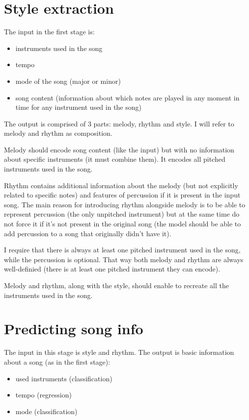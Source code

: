 \documentclass[en]{pracamgr}
\begin{document}
\section{Style extraction}

The input in the first stage is:
\begin{itemize}
    \item instruments used in the song
    \item tempo
    \item mode of the song (major or minor)
    \item song content (information about which notes are played in any moment in time for any instrument used in the song)
\end{itemize}

The output is comprised of 3 parts: melody, rhythm and style.
I will refer to melody and rhythm as composition.

Melody should encode song content (like the input) but with no information about specific instruments (it must combine them).
It encodes all pitched instruments used in the song.

Rhythm contains additional information about the melody (but not explicitly related to specific notes) and features of percussion if it is present in the input song.
The main reason for introducing rhythm alongside melody is to be able to represent percussion (the only unpitched instrument) but at the same time do not force it if it's not present in the original song (the model should be able to add percussion to a song that originally didn't have it).

I require that there is always at least one pitched instrument used in the song, while the percussion is optional.
That way both melody and rhythm are always well-definied (there is at least one pitched instrument they can encode).

Melody and rhythm, along with the style, should enable to recreate all the instruments used in the song.

\section{Predicting song info}

The input in this stage is style and rhythm.
The output is basic information about a song (as in the first stage):
\begin{itemize}
    \item used instruments (classification)
    \item tempo (regression)
    \item mode (classification)
\end{itemize}
\end{document}

